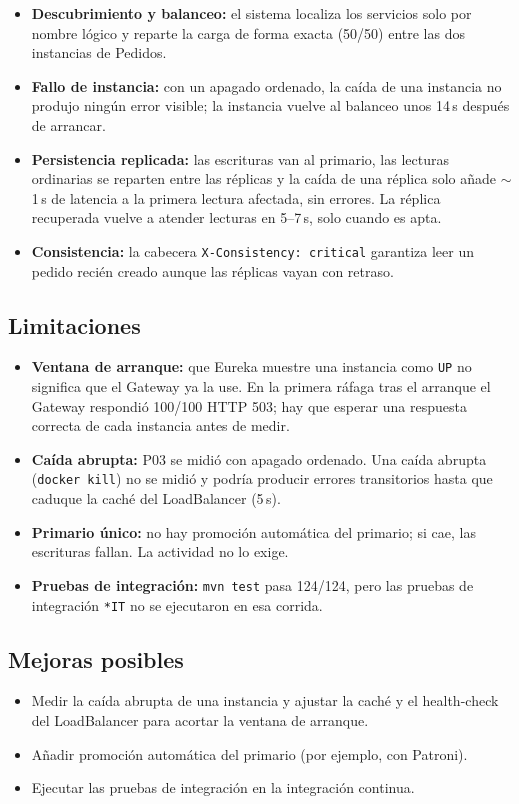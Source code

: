 \documentclass[
  spanish,
  a4paper,
  11pt
]{article}
\providecommand{\tightlist}{\setlength{\itemsep}{0pt}\setlength{\parskip}{0pt}}
\begin{document}
\begin{itemize}
\item \textbf{Descubrimiento y balanceo:} el sistema localiza los servicios
  solo por nombre lógico y reparte la carga de forma exacta (50/50) entre las
  dos instancias de Pedidos.
\item \textbf{Fallo de instancia:} con un apagado ordenado, la caída de una
  instancia no produjo ningún error visible; la instancia vuelve al balanceo
  unos 14\,s después de arrancar.
\item \textbf{Persistencia replicada:} las escrituras van al primario, las
  lecturas ordinarias se reparten entre las réplicas y la caída de una réplica
  solo añade $\sim$1\,s de latencia a la primera lectura afectada, sin errores.
  La réplica recuperada vuelve a atender lecturas en 5--7\,s, solo cuando es
  apta.
\item \textbf{Consistencia:} la cabecera \texttt{X-Consistency: critical}
  garantiza leer un pedido recién creado aunque las réplicas vayan con
  retraso.
\end{itemize}

\subsection{Limitaciones}
\begin{itemize}
\tightlist
\item \textbf{Ventana de arranque:} que Eureka muestre una instancia como
  \texttt{UP} no significa que el Gateway ya la use. En la primera ráfaga tras
  el arranque el Gateway respondió 100/100 HTTP 503; hay que esperar una
  respuesta correcta de cada instancia antes de medir.
\item \textbf{Caída abrupta:} P03 se midió con apagado ordenado. Una caída
  abrupta (\texttt{docker kill}) no se midió y podría producir errores
  transitorios hasta que caduque la caché del LoadBalancer (5\,s).
\item \textbf{Primario único:} no hay promoción automática del primario; si
  cae, las escrituras fallan. La actividad no lo exige.
\item \textbf{Pruebas de integración:} \texttt{mvn test} pasa 124/124, pero
  las pruebas de integración \texttt{*IT} no se ejecutaron en esa corrida.
\end{itemize}

\subsection{Mejoras posibles}
\begin{itemize}
\tightlist
\item Medir la caída abrupta de una instancia y ajustar la caché y el
  health-check del LoadBalancer para acortar la ventana de arranque.
\item Añadir promoción automática del primario (por ejemplo, con Patroni).
\item Ejecutar las pruebas de integración en la integración continua.
\end{itemize}
\end{document}
